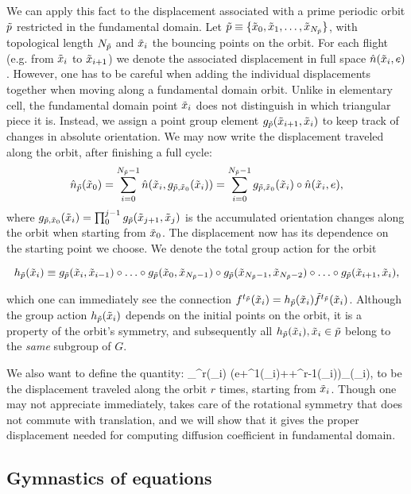 \documentclass[aps,pre,
                showpacs,
                twocolumn,
                groupedaddress,
                floatfix]{revtex4-1}
\begin{document}
We can apply this fact to the displacement associated with a prime periodic
orbit ${\tilde p}$ restricted in the fundamental domain. Let
${\tilde p}\equiv\{\tilde x_0,\tilde x_1,\ldots,\tilde x_{N_{\tilde p}}\}$, with topological length $N_{\tilde p}$
and $\tilde x_i$ the bouncing points on the orbit. For each flight (e.g. from $\tilde x_i$
to $\tilde x_{i+1}$) we denote the associated displacement in full space $\hat n(\tilde x_i,
e)$. However, one has to be careful when adding the individual displacements
together when moving along a fundamental domain orbit. Unlike in elementary
cell, the fundamental domain point $\tilde x_i$ does not distinguish in which
triangular piece it is. Instead, we assign a point group element
$g_{\tilde p}(\tilde x_{i+1},\tilde x_{i})$ to keep track of changes in absolute orientation. We
may now write the displacement traveled along the orbit, after finishing a full
cycle:
\[
\hat n_{{\tilde p}}(\tilde x_{0})=\sum_{i=0}^{N_{\tilde p}-1}\hat n(\tilde x_{i},g_{{\tilde p},\tilde x_0}(\tilde x_{i}))=\sum_{i=0}^{N_{\tilde p}-1}g_{{\tilde p},\tilde x_{0}}(\tilde x_{i})\circ\hat n(\tilde x_{i},e),
\]
where $g_{{\tilde p},\tilde x_{0}}(\tilde x_i)=\prod_0^{j-1} g_{\tilde p}(\tilde x_{j+1},\tilde x_{j})$ is the
accumulated orientation changes along the orbit when starting from $\tilde x_{0}$.
The displacement now has its dependence on the starting point we choose. We
denote the total group action for the orbit
\begin{widetext}
\[h_{{\tilde p}}(\tilde x_i)\equiv g_{\tilde p}(\tilde x_{i},\tilde x_{i-1})\circ\ldots\circ
g_{\tilde p}(\tilde x_{0},\tilde x_{N_{\tilde p}-1})\circ
g_{\tilde p}(\tilde x_{N_{\tilde p}-1},\tilde x_{N_{\tilde p}-2})\circ \ldots\circ
g_{\tilde p}(\tilde x_{i+1},\tilde x_{i}),\]
\end{widetext}
which one can immediately see the connection
${f^{t_{\tilde p}}(\tilde x_i)}=h_{{\tilde p}}(\tilde x_i){\tilde{f}^{t_{\tilde p}}(\tilde x_i)}$. Although the group
action $h_{{\tilde p}}(\tilde x_i)$ depends on the initial points on the orbit, it is a
property of the orbit's symmetry, and subsequently all $h_{{\tilde p}}(\tilde x_i), \tilde x_i\in
{\tilde p}$ belong to the \emph{same} subgroup of $G$.

We also want to define the quantity:
\beq
{}_{\tp}^{r}(\tx_i)\equiv
(e+\hp^{1}(\tx_i)+\cdots+\hp^{r-1}(\tx_i))\cdot\hn_{\tp}(\tx_i),
\label{eq-fdDisplacement}
\eeq
to be the displacement traveled along the orbit $r$ times, starting from $\tilde x_i$.  Though one may not appreciate immediately,  takes care of the rotational symmetry that does not commute with translation, and we will show that it gives the proper displacement needed for computing diffusion coefficient in fundamental domain.


\subsection{Gymnastics of equations}
\end{document}
